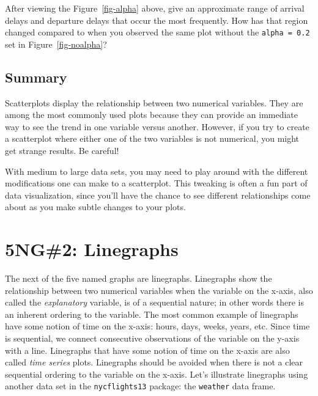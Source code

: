 \documentclass[
  letterpaper,
  DIV=11,
  numbers=noendperiod]{scrreprt}
\theoremstyle{definition}
\theoremstyle{remark}
\begin{document}
\begin{tcolorbox}[enhanced jigsaw, colback=white, toprule=.15mm, bottomrule=.15mm, titlerule=0mm, title={{🎯} Learning Check 2.8}, leftrule=.75mm, arc=.35mm, left=2mm, colframe=quarto-callout-tip-color-frame, coltitle=black, opacitybacktitle=0.6, bottomtitle=1mm, colbacktitle=quarto-callout-tip-color!10!white, opacityback=0, toptitle=1mm, rightrule=.15mm, breakable]

After viewing the Figure~\ref{fig-alpha} above, give an approximate
range of arrival delays and departure delays that occur the most
frequently. How has that region changed compared to when you observed
the same plot without the \texttt{alpha\ =\ 0.2} set in
Figure~\ref{fig-noalpha}?

\end{tcolorbox}

\hypertarget{summary}{%
\subsection{Summary}\label{summary}}

Scatterplots display the relationship between two numerical variables.
They are among the most commonly used plots because they can provide an
immediate way to see the trend in one variable versus another. However,
if you try to create a scatterplot where either one of the two variables
is not numerical, you might get strange results. Be careful!

With medium to large data sets, you may need to play around with the
different modifications one can make to a scatterplot. This tweaking is
often a fun part of data visualization, since you'll have the chance to
see different relationships come about as you make subtle changes to
your plots.

\hypertarget{sec-linegraphs}{%
\section{5NG\#2: Linegraphs}\label{sec-linegraphs}}

The next of the five named graphs are linegraphs. Linegraphs show the
relationship between two numerical variables when the variable on the
x-axis, also called the \emph{explanatory} variable, is of a sequential
nature; in other words there is an inherent ordering to the variable.
The most common example of linegraphs have some notion of time on the
x-axis: hours, days, weeks, years, etc. Since time is sequential, we
connect consecutive observations of the variable on the y-axis with a
line. Linegraphs that have some notion of time on the x-axis are also
called \emph{time series} plots. Linegraphs should be avoided when there
is not a clear sequential ordering to the variable on the x-axis. Let's
illustrate linegraphs using another data set in the
\texttt{nycflights13} package: the \texttt{weather} data frame.
\end{document}
